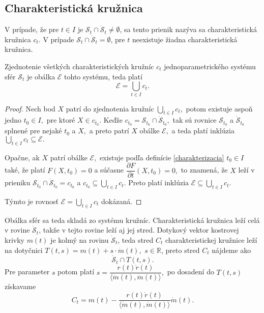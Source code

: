\subsection{Charakteristická kružnica}
\begin{definition}
V prípade, že pre $t \in I$ je $\mathcal{S}_{t} \cap \mathcal{\dot{S}}_{t} \neq \emptyset$, sa tento prienik nazýva sa charakteristická kružnica $c_{t}$. V prípade $\mathcal{S}_{t} \cap \mathcal{\dot{S}}_{t} = \emptyset$, pre \(t\) neexistuje žiadna charakteristická kružnica.
\end{definition}

\begin{lemma} \label{lema o zjednoteni charakteristickych kruznic}
Zjednotenie všetkých charakteristických kružníc $c_{t}$ jednoparametrického systému sfér $\mathcal{S}_t$ je obálka $\mathcal{E}$ tohto systému, teda platí $$\mathcal{E} = \bigcup_{t \in I} c_{t}.$$
\end{lemma}

\begin{proof}
Nech bod $X$ patrí do zjednotenia kružníc $ \bigcup_{t \in I} c_{t}, $ potom existuje aspoň jedno $t_0 \in I, $ pre ktoré $X \in c_{t_0}.$ Keďže $c_{t_0} = \mathcal{S}_{t_0} \cap \mathcal{\dot{S}}_{t_0}, $ tak sú rovnice $\mathcal{S}_{t_0} $ a $ \mathcal{\dot{S}}_{t_0}$ splnené pre nejaké $t_0$ a $X,$ a preto patrí $X$ obálke $\mathcal{E}, $ a teda platí inklúzia $\bigcup_{t \in I} c_{t} \subseteq \mathcal{E}. $

Opačne, ak $X$ patrí obálke $\mathcal{E},$ existuje podľa definície \ref{charakterizacia} $t_0 \in I $ také, že platí $F(X,t_0) = 0$ a súčasne $\dfrac{\partial F}{\partial t}(X, t_0)=0,$ to znamená, že $X$ leží v prieniku $\mathcal{S}_{t_0} \cap \mathcal{\dot{S}}_{t_0} = c_{t_0} $ a $c_{t_0} \subseteq \bigcup_{t \in I} c_t. $ Preto platí inklúzia $\mathcal{E} \subseteq \bigcup_{t \in I} c_t.$ 

Týmto je rovnosť $\mathcal{E} = \bigcup_{t \in I} c_t$ dokázaná.
\end{proof}

Obálka sfér sa teda skladá zo systému kružníc. Charakteristická kružnica leží celá v rovine $\mathcal{\dot{S}}_t $, takže v tejto rovine leží aj jej stred. Dotykový vektor kostrovej krivky $m(t)$ je kolmý na rovinu $\mathcal{\dot{S}}_t$, teda stred $C_t$ charakteristickej kružnice leží na dotyčnici $T(t, s)= m(t) + s \cdot \dot{m}(t),$ $s \in \mathbb{R}$, preto stred $C_t$ nájdeme ako
$$ \mathcal{\dot{S}}_t \cap T(t, s).$$
Pre parameter $s$ potom platí $s = \dfrac{r(t) \dot{r}(t)}{\langle \dot{m}(t), \dot{m}(t) \rangle }, $
po dosadení do $T(t, s)$ získavame
\begin{equation}
\label{eq:stred charakteristickej kruznice}
C_t = m(t) - \frac{r(t) \dot{r}(t)}{\langle \dot{m}(t), \dot{m}(t) \rangle} \dot{m}(t).
\end{equation}

